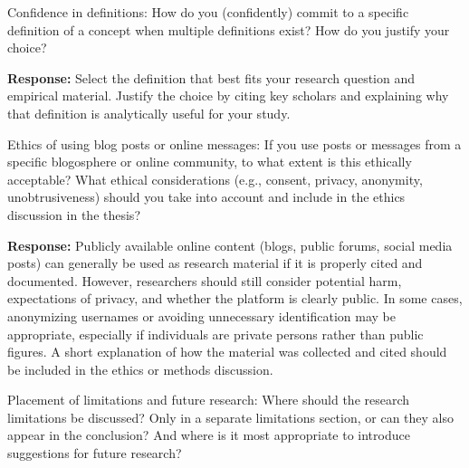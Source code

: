 \documentclass[11pt,a4paper]{article}
\begin{document}
\vspace{1.2em}


\begin{questionbox}
Confidence in definitions: How do you (confidently) commit to a specific definition of a concept when multiple definitions exist? How do you justify your choice?
\end{questionbox}

\noindent\textbf{Response:} Select the definition that best fits your research question and empirical material. Justify the choice by citing key scholars and explaining why that definition is analytically useful for your study.

\vspace{1.2em}


\begin{questionbox}
Ethics of using blog posts or online messages: If you use posts or messages from a specific blogosphere or online community, to what extent is this ethically acceptable? What ethical considerations (e.g., consent, privacy, anonymity, unobtrusiveness) should you take into account and include in the ethics discussion in the thesis?
\end{questionbox}

\noindent\textbf{Response:} Publicly available online content (blogs, public forums, social media posts) can generally be used as research material if it is properly cited and documented. However, researchers should still consider potential harm, expectations of privacy, and whether the platform is clearly public. In some cases, anonymizing usernames or avoiding unnecessary identification may be appropriate, especially if individuals are private persons rather than public figures. A short explanation of how the material was collected and cited should be included in the ethics or methods discussion.

\vspace{1.2em}


\begin{questionbox}
Placement of limitations and future research: Where should the research limitations be discussed? Only in a separate limitations section, or can they also appear in the conclusion? And where is it most appropriate to introduce suggestions for future research?
\end{questionbox}
\end{document}
